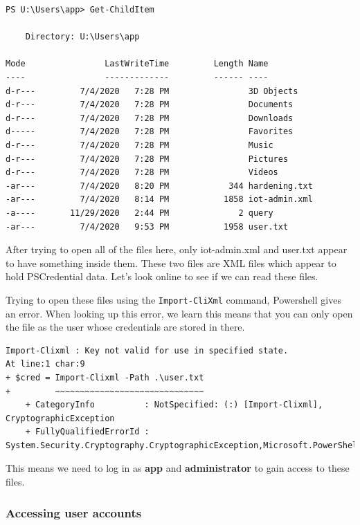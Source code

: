 \documentclass[../main.tex]{subfiles}
\begin{document}
\begin{lstlisting}
PS U:\Users\app> Get-ChildItem

    Directory: U:\Users\app

Mode                LastWriteTime         Length Name                          
----                -------------         ------ ----                          
d-r---         7/4/2020   7:28 PM                3D Objects                    
d-r---         7/4/2020   7:28 PM                Documents                     
d-r---         7/4/2020   7:28 PM                Downloads                     
d-----         7/4/2020   7:28 PM                Favorites                     
d-r---         7/4/2020   7:28 PM                Music                         
d-r---         7/4/2020   7:28 PM                Pictures                      
d-r---         7/4/2020   7:28 PM                Videos                        
-ar---         7/4/2020   8:20 PM            344 hardening.txt                 
-ar---         7/4/2020   8:14 PM           1858 iot-admin.xml                 
-a----       11/29/2020   2:44 PM              2 query                         
-ar---         7/4/2020   9:53 PM           1958 user.txt
\end{lstlisting}

After trying to open all of the files here, only iot-admin.xml and user.txt appear to have something inside them. These two files are XML files which appear to hold PSCredential data. Let's look online to see if we can read these files.

Trying to open these files using the \lstinline{Import-CliXml} command, Powershell gives an error. When looking up this error, we learn this means that you can only open the file as the user whose credentials are stored in there.

\begin{lstlisting}
Import-Clixml : Key not valid for use in specified state.
At line:1 char:9
+ $cred = Import-Clixml -Path .\user.txt
+         ~~~~~~~~~~~~~~~~~~~~~~~~~~~~~~
    + CategoryInfo          : NotSpecified: (:) [Import-Clixml], CryptographicException
    + FullyQualifiedErrorId : System.Security.Cryptography.CryptographicException,Microsoft.PowerShell.Commands.ImportClixmlCommand
\end{lstlisting}

This means we need to log in as \textbf{app} and \textbf{administrator} to gain access to these files.

\subsubsection{Accessing user accounts}
\end{document}
